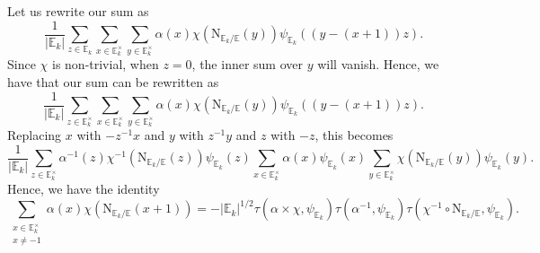 \documentclass[12pt, reqno]{amsart}
\theoremstyle{definition}
\theoremstyle{definition}
\theoremstyle{definition}
\newcommand{\multiplicativegroup}[1]{#1^{\times}}
\newcommand{\sizeof}[1]{\left|#1\right|}
\newcommand{\fieldCharacter}{\psi}
\newcommand{\aFieldNorm}{\mathrm{N}}
\newcommand{\quadraticExtension}{\mathbb{E}}
\newcommand{\quadraticFieldExtension}[1]{\quadraticExtension_{#1}}
\newcommand{\GaussSumSingleCharacter}[2]{\tau\left(#1, #2\right)}
\newcommand{\GaussSumCharacter}[3]{\tau\left(#1 \times #2, #3\right)}
\begin{document}
Let us rewrite our sum as
$$\frac{1}{\sizeof{\quadraticFieldExtension{k}}} \sum_{z \in \quadraticFieldExtension{k}} \sum_{x \in  \multiplicativegroup{\quadraticFieldExtension{k}}} \sum_{y \in \multiplicativegroup{\quadraticFieldExtension{k}}}\alpha\left(x\right) \chi\left(\aFieldNorm_{\quadraticFieldExtension{k} \slash \quadraticExtension}\left(y\right)\right) \fieldCharacter_{\quadraticFieldExtension{k}}\left(\left(y - \left(x + 1\right)\right)z\right).$$
Since $\chi$ is non-trivial, when $z = 0$, the inner sum over $y$ will vanish. Hence, we have that our sum can be rewritten as
$$\frac{1}{\sizeof{\quadraticFieldExtension{k}}} \sum_{z \in \multiplicativegroup{\quadraticFieldExtension{k}}} \sum_{x \in  \multiplicativegroup{\quadraticFieldExtension{k}}} \sum_{y \in \multiplicativegroup{\quadraticFieldExtension{k}}}\alpha\left(x\right) \chi\left(\aFieldNorm_{\quadraticFieldExtension{k} \slash \quadraticExtension}\left(y\right)\right) \fieldCharacter_{\quadraticFieldExtension{k}}\left(\left(y - \left(x + 1\right)\right)z\right).$$
Replacing $x$ with $-z^{-1} x$ and $y$ with $z^{-1} y$ and $z$ with $-z$, this becomes
$$\frac{1}{\sizeof{\quadraticFieldExtension{k}}} \sum_{z \in \multiplicativegroup{\quadraticFieldExtension{k}}} \alpha^{-1}\left(z\right) \chi^{-1}\left(\aFieldNorm_{\quadraticFieldExtension{k} \slash \quadraticExtension}\left(z\right)\right) \fieldCharacter_{\quadraticFieldExtension{k}}\left(z\right) \sum_{x \in  \multiplicativegroup{\quadraticFieldExtension{k}}} \alpha\left(x\right) \fieldCharacter_{\quadraticFieldExtension{k}}\left(x\right) \sum_{y \in \multiplicativegroup{\quadraticFieldExtension{k}}} \chi\left(\aFieldNorm_{\quadraticFieldExtension{k} \slash \quadraticExtension}\left(y\right)\right) \fieldCharacter_{\quadraticFieldExtension{k}}\left(y\right).$$
Hence, we have the identity
$$\sum_{\substack{x \in \multiplicativegroup{\quadraticFieldExtension{k}}\\
x \ne -1}} \alpha\left(x\right) \chi\left(\aFieldNorm_{\quadraticFieldExtension{k} \slash \quadraticExtension}\left(x+1\right)\right) = -\sizeof{\quadraticFieldExtension{k}}^{1/2} \GaussSumCharacter{\alpha}{\chi}{\fieldCharacter_{\quadraticFieldExtension{k}}} \GaussSumSingleCharacter{\alpha^{-1}} {\fieldCharacter_{\quadraticFieldExtension{k}}} \GaussSumSingleCharacter{\chi^{-1} \circ \aFieldNorm_{\quadraticFieldExtension{k} \slash \quadraticExtension}}{\fieldCharacter_{\quadraticFieldExtension{k}}}.$$
\end{document}
